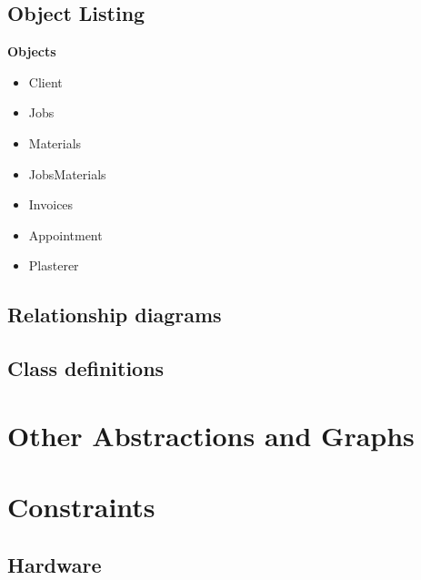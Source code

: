 \subsection{Object Listing}

\textbf{Objects}
	\begin{itemize}
		\item Client
		\item Jobs
		\item Materials
		\item JobsMaterials
		\item Invoices
		\item Appointment
		\item Plasterer
	\end{itemize}

\subsection{Relationship diagrams}



\subsection{Class definitions}





\section{Other Abstractions and Graphs}

\section{Constraints}

\subsection{Hardware}

